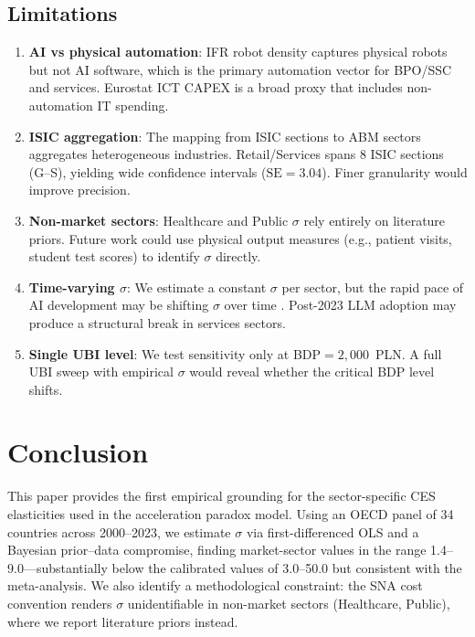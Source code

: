 \documentclass[11pt,a4paper]{article}
\begin{document}
\subsection{Limitations}

\begin{enumerate}
    \item \textbf{AI vs physical automation}: IFR robot density captures physical robots but not AI software, which is the primary automation vector for BPO/SSC and services. Eurostat ICT CAPEX is a broad proxy that includes non-automation IT spending.
    \item \textbf{ISIC aggregation}: The mapping from ISIC sections to ABM sectors aggregates heterogeneous industries. Retail/Services spans 8 ISIC sections (G--S), yielding wide confidence intervals ($\text{SE}=3.04$). Finer granularity would improve precision.
    \item \textbf{Non-market sectors}: Healthcare and Public $\sigma$ rely entirely on literature priors.  Future work could use physical output measures (e.g., patient visits, student test scores) to identify $\sigma$ directly.
    \item \textbf{Time-varying $\sigma$}: We estimate a constant $\sigma$ per sector, but the rapid pace of AI development may be shifting $\sigma$ over time \autocite{acemoglu2018race}. Post-2023 LLM adoption may produce a structural break in services sectors.
    \item \textbf{Single UBI level}: We test sensitivity only at BDP$=2{,}000$~PLN. A full UBI sweep with empirical $\sigma$ would reveal whether the critical BDP level shifts.
\end{enumerate}


\section{Conclusion}
\label{sec:conclusion}

This paper provides the first empirical grounding for the sector-specific CES elasticities used in the acceleration paradox model.
Using an OECD panel of 34 countries across 2000--2023, we estimate $\sigma$ via first-differenced OLS and a Bayesian prior--data compromise, finding market-sector values in the range 1.4--9.0---substantially below the calibrated values of 3.0--50.0 but consistent with the \autocite{knoblach2020what} meta-analysis.
We also identify a methodological constraint: the SNA cost convention renders $\sigma$ unidentifiable in non-market sectors (Healthcare, Public), where we report literature priors instead.
\end{document}
